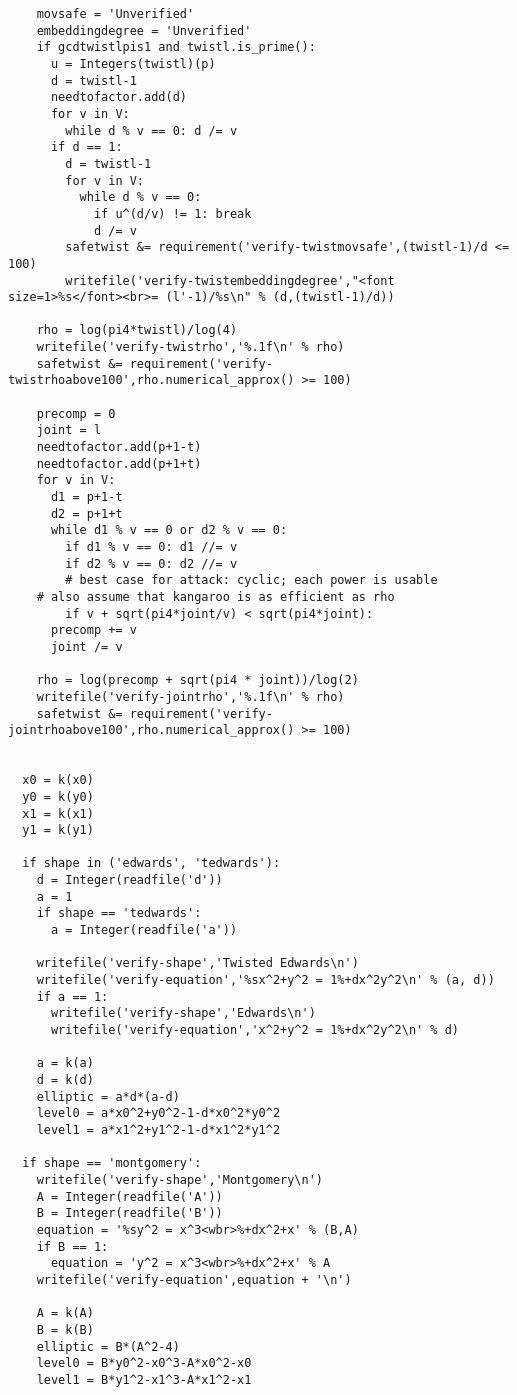 \begin{lstlisting}
    movsafe = 'Unverified'
    embeddingdegree = 'Unverified'
    if gcdtwistlpis1 and twistl.is_prime():
      u = Integers(twistl)(p)
      d = twistl-1
      needtofactor.add(d)
      for v in V:
        while d % v == 0: d /= v
      if d == 1:
        d = twistl-1
        for v in V:
          while d % v == 0:
            if u^(d/v) != 1: break
            d /= v
        safetwist &= requirement('verify-twistmovsafe',(twistl-1)/d <= 100)
        writefile('verify-twistembeddingdegree',"<font size=1>%s</font><br>= (l'-1)/%s\n" % (d,(twistl-1)/d))

    rho = log(pi4*twistl)/log(4)
    writefile('verify-twistrho','%.1f\n' % rho)
    safetwist &= requirement('verify-twistrhoabove100',rho.numerical_approx() >= 100)

    precomp = 0
    joint = l
    needtofactor.add(p+1-t)
    needtofactor.add(p+1+t)
    for v in V:
      d1 = p+1-t
      d2 = p+1+t
      while d1 % v == 0 or d2 % v == 0:
        if d1 % v == 0: d1 //= v
        if d2 % v == 0: d2 //= v
        # best case for attack: cyclic; each power is usable
	# also assume that kangaroo is as efficient as rho
        if v + sqrt(pi4*joint/v) < sqrt(pi4*joint):
	  precomp += v
	  joint /= v
        
    rho = log(precomp + sqrt(pi4 * joint))/log(2)
    writefile('verify-jointrho','%.1f\n' % rho)
    safetwist &= requirement('verify-jointrhoabove100',rho.numerical_approx() >= 100)


  x0 = k(x0)
  y0 = k(y0)
  x1 = k(x1)
  y1 = k(y1)

  if shape in ('edwards', 'tedwards'):
    d = Integer(readfile('d'))
    a = 1
    if shape == 'tedwards':
      a = Integer(readfile('a'))

    writefile('verify-shape','Twisted Edwards\n')
    writefile('verify-equation','%sx^2+y^2 = 1%+dx^2y^2\n' % (a, d))
    if a == 1:
      writefile('verify-shape','Edwards\n')
      writefile('verify-equation','x^2+y^2 = 1%+dx^2y^2\n' % d)

    a = k(a)
    d = k(d)
    elliptic = a*d*(a-d)
    level0 = a*x0^2+y0^2-1-d*x0^2*y0^2
    level1 = a*x1^2+y1^2-1-d*x1^2*y1^2

  if shape == 'montgomery':
    writefile('verify-shape','Montgomery\n')
    A = Integer(readfile('A'))
    B = Integer(readfile('B'))
    equation = '%sy^2 = x^3<wbr>%+dx^2+x' % (B,A)
    if B == 1:
      equation = 'y^2 = x^3<wbr>%+dx^2+x' % A
    writefile('verify-equation',equation + '\n')

    A = k(A)
    B = k(B)
    elliptic = B*(A^2-4)
    level0 = B*y0^2-x0^3-A*x0^2-x0
    level1 = B*y1^2-x1^3-A*x1^2-x1


\end{lstlisting}
